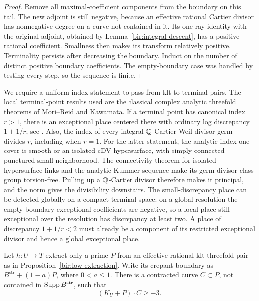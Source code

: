\begin{proof}
Remove all maximal-coefficient components from the boundary on this
tail.  The new adjoint is still negative, because an effective
rational Cartier divisor has nonnegative degree on a curve not
contained in it.  Its one-ray identity with the original adjoint,
obtained by Lemma~\ref{bir:integral-descent}, has a positive rational
coefficient.  Smallness then makes its transform relatively positive.
Terminality persists after decreasing the boundary.  Induct on the
number of distinct positive boundary coefficients.  The empty-boundary
case was handled by testing every step, so the sequence is finite.
\end{proof}

We require a uniform index statement to pass from klt to terminal
pairs.  The local terminal-point results used are the classical
complex analytic threefold theorems of Mori--Reid and Kawamata.  If a
terminal point has canonical index $r>1$, there is an exceptional
place centered there with ordinary log discrepancy $1+1/r$; see
\cite{KawamataTerminalDiscrepancy}.  Also, the index of every integral
$\mathbb{Q}$-Cartier Weil divisor germ divides $r$, including when $r=1$.
For the latter statement, the analytic index-one cover is smooth or
an isolated cDV hypersurface, with simply connected punctured small
neighborhood.  The connectivity theorem for isolated hypersurface
links and the analytic Kummer sequence make its germ divisor class
group torsion-free.  Pulling up a $\mathbb{Q}$-Cartier divisor therefore makes
it principal, and the norm gives the divisibility downstairs.  The
small-discrepancy place can be detected globally on a compact
terminal space: on a global resolution the empty-boundary exceptional
coefficients are negative, so a local place still exceptional over
the resolution has discrepancy at least two.  A place of discrepancy
$1+1/r<2$ must already be a component of its restricted exceptional
divisor and hence a global exceptional place.

\begin{lemma}
\label{bir:surface-estimate}
Let $h:U\to T$ extract only a prime $P$ from an effective rational
klt threefold pair as in Proposition~\ref{bir:low-extraction}.  Write
its crepant boundary as $B^{\mathrm{str}}+(1-a)P$, where $0<a\leq1$.
There is a contracted curve $C\subset P$, not contained in
$\operatorname{Supp} B^{\mathrm{str}}$, such that
\begin{equation}
 (K_U+P)\cdot C\geq-3.
 \label{bir:surface-degree}
\end{equation}
\end{lemma}

